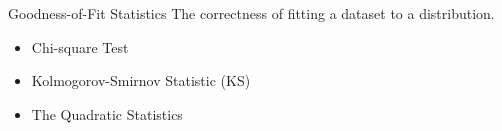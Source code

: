 \documentclass{beamer}
\begin{document}
    \begin{frame}{Goodness-of-Fit  Statistics}
        The correctness of ﬁtting a dataset to a distribution.
        \begin{itemize}
            \item Chi-square Test 
            \item Kolmogorov-Smirnov Statistic (KS)
            \item The Quadratic Statistics
        \end{itemize}
    \end{frame}


\end{document}

